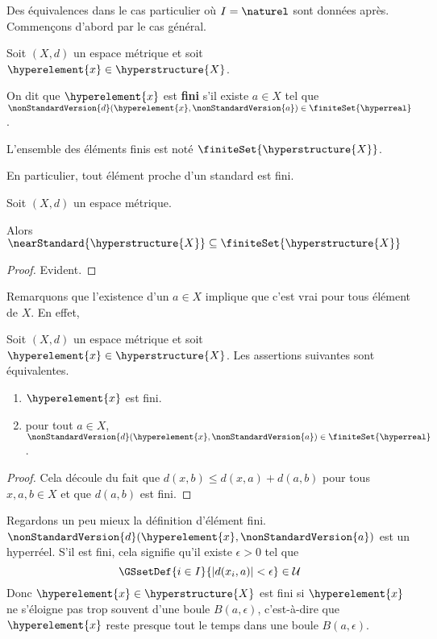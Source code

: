 Des équivalences dans le cas particulier où $I = \naturel$ sont données après.
Commençons d'abord par le cas général.

\begin{definition} 
	Soit $(X, d)$ un espace métrique et soit $\hyperelement{x} \in
	\hyperstructure{X}$.

	On dit que $\hyperelement{x}$ est \textbf{fini} s'il existe $a \in X$ tel que
	$\nonStandardVersion{d}(\hyperelement{x}, \nonStandardVersion{a}) \in
	\finiteSet{\hyperreal}$.

	L'ensemble des éléments finis est noté $\finiteSet{\hyperstructure{X}}$.
\end{definition}

En particulier, tout élément proche d'un standard est fini.

\begin{proposition}
	Soit $(X, d)$ un espace métrique.

	Alors $\nearStandard{\hyperstructure{X}} \subseteq
	\finiteSet{\hyperstructure{X}}$
\end{proposition}

\ifdefined\outputproof
\begin{proof}
	Evident.
\end{proof}
\fi

Remarquons que l'existence d'un $a \in X$ implique que c'est vrai pour tous
élément de $X$. En effet,

\begin{proposition}
	Soit $(X, d)$ un espace métrique et soit $\hyperelement{x} \in
	\hyperstructure{X}$. Les assertions suivantes sont équivalentes.

	\begin{enumerate}
		\item $\hyperelement{x}$ est fini.
		\item pour tout $a \in X$, $\nonStandardVersion{d}(\hyperelement{x},
			\nonStandardVersion{a}) \in \finiteSet{\hyperreal}$.
	\end{enumerate}
\end{proposition}

\ifdefined\outputproof
\begin{proof}
	Cela découle du fait que $d(x, b) \leq d(x, a) + d(a, b)$ pour tous $x, a, b
	\in X$ et que $d(a, b)$ est fini.
\end{proof}
\fi

Regardons un peu mieux la définition d'élément fini.
$\nonStandardVersion{d}(\hyperelement{x}, \nonStandardVersion{a})$ est un
hyperréel. S'il est fini, cela signifie qu'il existe $\epsilon > 0$ tel que
\begin{equation}
	\GSsetDef{i \in I}{\abs{d(x_{i}, a)} < \epsilon} \in \mathcal{U}
\end{equation}
Donc $\hyperelement{x} \in \hyperstructure{X}$ est fini si $\hyperelement{x}$ ne
s'éloigne pas trop souvent d'une boule $B(a, \epsilon)$, c'est-à-dire que
$\hyperelement{x}$ reste presque tout le temps dans une boule $B(a, \epsilon)$.

